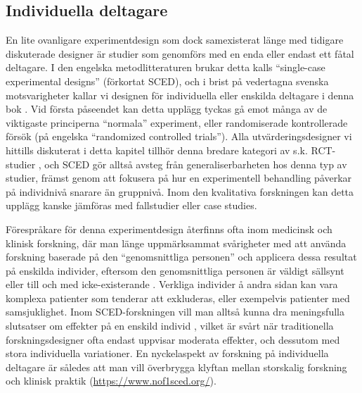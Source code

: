 \documentclass[
]{book}
\begin{document}
\hypertarget{sub07.5.7}{%
\subsection{Individuella deltagare}\label{sub07.5.7}}

En lite ovanligare experimentdesign som dock samexisterat länge med tidigare diskuterade designer är studier som genomförs med en enda eller endast ett fåtal deltagare. I den engelska metodlitteraturen brukar detta kalls ``single-case experimental designs'' (förkortat SCED), och i brist på vedertagna svenska motsvarigheter kallar vi designen för individuella eller enskilda deltagare i denna bok \citep{barlow2009single}. Vid första påseendet kan detta upplägg tyckas gå emot många av de viktigaste principerna ``normala'' experiment, eller randomiserade kontrollerade försök (på engelska ``randomized controlled trials''). Alla utvärderingsdesigner vi hittills diskuterat i detta kapitel tillhör denna bredare kategori av s.k. RCT-studier \citep{grossman2005randomized}, och SCED gör alltså avsteg från generaliserbarheten hos denna typ av studier, främst genom att fokusera på hur en experimentell behandling påverkar på individnivå snarare än gruppnivå. Inom den kvalitativa forskningen kan detta upplägg kanske jämföras med fallstudier eller case studies.

Förespråkare för denna experimentdesign återfinns ofta inom medicinsk och klinisk forskning, där man länge uppmärksammat svårigheter med att använda forskning baserade på den ``genomsnittliga personen'' och applicera dessa resultat på enskilda individer, eftersom den genomsnittliga personen är väldigt sällsynt eller till och med icke-existerande \citep{jhangiani2015research}. Verkliga individer å andra sidan kan vara komplexa patienter som tenderar att exkluderas, eller exempelvis patienter med samsjuklighet. Inom SCED-forskningen vill man alltså kunna dra meningsfulla slutsatser om effekter på en enskild individ \citep{schork2015personalized}, vilket är svårt när traditionella forskningsdesigner ofta endast uppvisar moderata effekter, och dessutom med stora individuella variationer. En nyckelaspekt av forskning på individuella deltagare är således att man vill överbrygga klyftan mellan storskalig forskning och klinisk praktik (\url{https://www.nof1sced.org/}).
\end{document}
